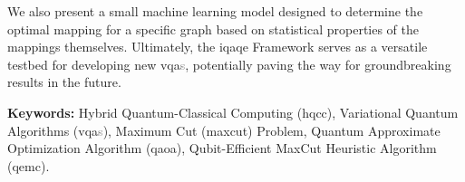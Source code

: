 We also present a small machine learning model designed to determine the optimal mapping for a specific graph based on statistical properties of the mappings themselves. Ultimately, the \acrshort{iqaqe} Framework serves as a versatile testbed for developing new \acrshort{vqa}\textcolor{gray}{s}, potentially paving the way for groundbreaking results in the future.

\vfill

\textbf{\Large Keywords:} \sloppy Hybrid Quantum-Classical Computing (\acrshort{hqcc}), Variational Quantum Algorithms (\acrshort{vqa}\textcolor{gray}{s}), Maximum Cut (\acrshort{maxcut}) Problem, Quantum Approximate Optimization Algorithm (\acrshort{qaoa}), Qubit-Efficient MaxCut Heuristic Algorithm (\acrshort{qemc}).